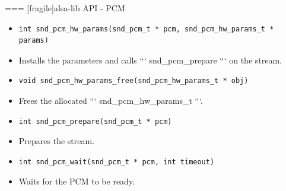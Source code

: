 === [fragile]{alsa-lib API - PCM}
  \begin{itemize}
  \item
    \begin{block}{}
    \fontsize{9}{9}\selectfont
      \begin{verbatim}
int snd_pcm_hw_params(snd_pcm_t * pcm, snd_pcm_hw_params_t * params)
       \end{verbatim}
    \end{block}
  \item Installs the parameters and calls ``` snd_pcm_prepare ``` on
    the stream.
  \item
    \begin{block}{}
    \fontsize{9}{9}\selectfont
      \begin{verbatim}
void snd_pcm_hw_params_free(snd_pcm_hw_params_t * obj)
      \end{verbatim}
    \end{block}
  \item Frees the allocated ``` snd_pcm_hw_params_t ```.
  \item
    \begin{block}{}
    \fontsize{9}{9}\selectfont
      \begin{verbatim}
int snd_pcm_prepare(snd_pcm_t * pcm)
      \end{verbatim}
    \end{block}
  \item Prepares the stream.
  \item
    \begin{block}{}
    \fontsize{9}{9}\selectfont
      \begin{verbatim}
int snd_pcm_wait(snd_pcm_t * pcm, int timeout)
      \end{verbatim}
    \end{block}
  \item Waits for the PCM to be ready.
  \end{itemize}


